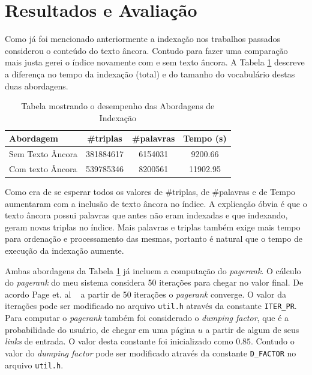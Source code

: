 \documentclass[a4paper]{article}
\begin{document}
\section{Resultados e Avaliação}






Como já foi mencionado anteriormente a indexação nos trabalhos passados considerou o 
conteúdo do texto âncora. Contudo para fazer uma comparação mais justa gerei o índice 
novamente com e sem texto âncora. A Tabela \ref{tbl:indexnum} descreve a diferença no 
tempo da indexação (total) 
e do tamanho do vocabulário destas duas abordagens.

\begin{table}[H]
    \centering
    \begin{tabular}{l|c|c|c} \hline
	Abordagem        & \#triplas & \#palavras & Tempo (s) \\ \hline \hline
	Sem Texto Âncora &  381884617& 6154031    & 9200.66  \\
	Com texto Âncora &  539785346& 8200561    & 11902.95    \\ \hline
    \end{tabular}
    \caption{Tabela mostrando o desempenho das Abordagens de Indexação}
    \label{tbl:indexnum}
\end{table}

Como era de se esperar todos os valores de \#triplas, de \#palavras e de Tempo aumentaram 
com a inclusão de texto âncora no índice. A explicação óbvia é que o texto âncora possui 
palavras que antes não eram indexadas e que indexando, geram novas triplas no índice. Mais palavras 
e triplas também exige mais tempo para ordenação e processamento das mesmas, portanto 
é natural que o tempo de execução da indexação aumente.

Ambas abordagens da Tabela \ref{tbl:indexnum} já incluem a computação do \emph{pagerank}. O 
cálculo do \emph{pagerank} do meu sistema considera 50 iterações para chegar no valor final. 
De acordo Page et. al ~\cite{page1999pagerank} a partir de 50 iterações o \emph{pagerank} 
converge. O valor da iterações pode ser modificado no arquivo \texttt{util.h} através da 
constante \texttt{ITER\_PR}. Para computar o \emph{pagerank} também foi considerado 
o \emph{dumping factor}, que é a probabilidade do usuário, de chegar em uma página $u$ 
a partir de algum de seus \emph{links} de entrada. O valor desta constante foi inicializado 
como $0.85$. Contudo o valor do \emph{dumping factor} pode ser modificado através da constante
\texttt{D\_FACTOR} no arquivo \texttt{util.h}.
\end{document}

